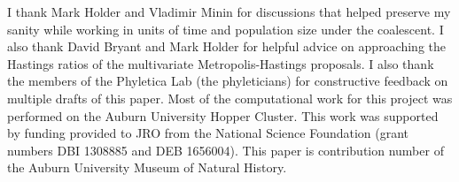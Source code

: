 I thank Mark Holder and Vladimir Minin for discussions that helped preserve my
sanity while working in units of time and population size under the coalescent.
I also thank David Bryant and Mark Holder for helpful advice on approaching the
Hastings ratios of the multivariate Metropolis-Hastings proposals.
I also thank the members of the Phyletica Lab (the phyleticians) for
constructive feedback on multiple drafts of this paper.
Most of the computational work for this project was performed on the
Auburn University Hopper Cluster.
This work was supported by funding provided to JRO from the National Science
Foundation (grant numbers DBI 1308885 and DEB 1656004).
This paper is contribution number  of the Auburn University
Museum of Natural History.

